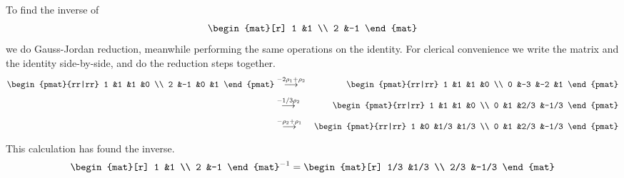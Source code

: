 \begin{example}
To find the inverse of
\begin{equation*}
    \begin{mat}[r]
       1  &1  \\
       2  &-1
    \end{mat}
\end{equation*}
we do Gauss-Jordan reduction, meanwhile performing the same operations on
the identity.
For clerical convenience we write the matrix and the identity side-by-side,
and do the reduction steps together.
\begin{eqnarray*}
    \begin{pmat}{rr|rr}
       1  &1   &1  &0  \\
       2  &-1  &0  &1
    \end{pmat}
  &\grstep{-2\rho_1+\rho_2}
  &\begin{pmat}{rr|rr}
        1  &1   &1  &0  \\
        0  &-3  &-2 &1
     \end{pmat}                 \\
  &\grstep{-1/3\rho_2}
  &\begin{pmat}{rr|rr}
        1  &1   &1   &0     \\
        0  &1   &2/3 &-1/3
     \end{pmat}                   \\
  &\grstep{-\rho_2+\rho_1}
  &\begin{pmat}{rr|rr}
        1  &0   &1/3 &1/3  \\
        0  &1   &2/3 &-1/3
     \end{pmat}
\end{eqnarray*}
This calculation has found the inverse.
\begin{equation*}
    \begin{mat}[r]
       1  &1  \\
       2  &-1
    \end{mat}^{-1}
  =
    \begin{mat}[r]
       1/3 &1/3  \\
       2/3 &-1/3
    \end{mat}
\end{equation*}
\end{example}

